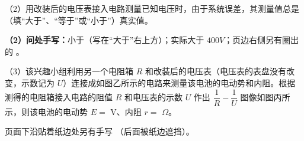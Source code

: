 \begin{problem}[粘贴印刷题 20]
（2）用改装后的电压表接入电路测量已知电压时，由于系统误差，其测量值总是 （填“大于”、“等于”或“小于”）真实值。%

\noindent\textbf{（2）问处手写：}小于（写在“大于”右上方）；实际大于 $400\unit{V}$；页边右侧另有圈出的 。

（3）该兴趣小组利用另一个电阻箱 $R$ 和改装后的电压表（电压表的表盘没有改变，示数记为 $U$）连接成如图乙所示的电路来测量该电池的电动势和内阻。根据测得的电阻箱接入电路的阻值 $R$ 和电压表的示数 $U$ 作出 $\dfrac1R-\dfrac1U$ 图像如图丙所示，则该电池的电动势 $E=$ \underline{\;} V、内阻 $r=$ \underline{\;} $\Omega$。%

\noindent 页面下沿贴着纸边处另有手写 （后面被纸边遮挡）。
\end{problem}

